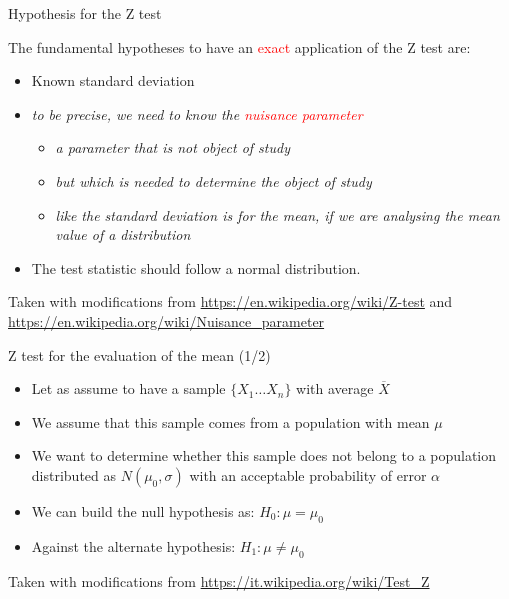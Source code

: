 \documentclass{beamer}
\begin{document}
\begin{frame}
{\centerline{Hypothesis for the Z test}}

The fundamental hypotheses to have an \textcolor{red}{exact} application of the Z test are:
\begin{itemize}
\item Known standard deviation
\item \textit{to be precise, we need to know the \textcolor{red}{nuisance parameter}}
\begin{itemize}
\item \textit{a parameter that is not object of study}
\item \textit{but which is needed to determine the object of study}
\item \textit{like the standard deviation is for the mean, if we are analysing the mean value of a distribution}
\end{itemize}

\item The test statistic should follow a normal distribution.
\end{itemize}

\begin{center}
\tiny{Taken with modifications from \url{https://en.wikipedia.org/wiki/Z-test} and \url{https://en.wikipedia.org/wiki/Nuisance_parameter}}
\end{center}


\end{frame}



\begin{frame}
{\centerline{Z test for the evaluation of the mean (1/2)}}

\begin{itemize}
\item Let as assume to have a sample $\{X_1 \ldots X_n\}$ with average $\overline {X}$
\item We assume that this sample comes from a population with mean $\mu$
\item We want to determine whether this sample does not belong to a population distributed as $N(\mu_0,\sigma)$ with an acceptable probability of error $\alpha$
\item We can build the null hypothesis as:  $H_0: \mu = \mu_0 $
\item Against the alternate hypothesis: $ H_1: \mu \neq \mu_0 $
\end{itemize}

\begin{center}
\tiny{Taken with modifications from \url{https://it.wikipedia.org/wiki/Test_Z}}
\end{center}

\end{frame}
\end{document}
